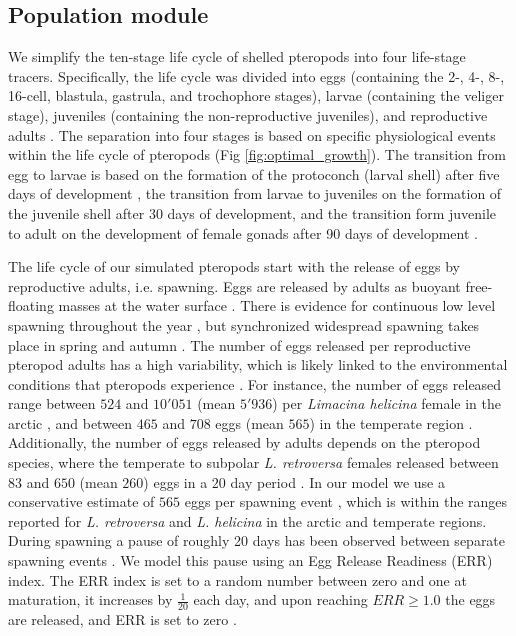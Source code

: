 \subsection{Population module}

We simplify the ten-stage life cycle of shelled pteropods \citep{Howes2014Lab,Thabet2015Lifestages} into four life-stage tracers. Specifically, the life cycle was divided into eggs (containing the 2-, 4-, 8-, 16-cell, blastula, gastrula, and trochophore stages), larvae (containing the veliger stage), juveniles (containing the non-reproductive juveniles), and reproductive adults \citep{Howes2014Lab,Thabet2015Lifestages}. The separation into four stages is based on specific physiological events within the life cycle of pteropods  (Fig \ref{fig:optimal_growth}). The transition from egg to larvae is based on the formation of the protoconch (larval shell) after five days of development \citep{Thabet2015Lifestages}, the transition from larvae to juveniles on the formation of the juvenile shell after 30 days of development, and the transition form juvenile to adult on the development of female gonads after 90 days of development \citep{lalli1989pelagic,Thabet2015Lifestages,Bednarsek2016CumulativeEffects}. 

The life cycle of our simulated pteropods start with the release of eggs by reproductive adults, i.e. spawning. Eggs are released by adults as buoyant free-floating masses at the water surface \citep{Lalli1978Reproduction,Paranjape1968egg,Schalk1990SeasonalSpatial,Gannefors2005Overwintering,Comeau2010Predation,Manno2016EggsAcidification}. There is evidence for continuous low level spawning  throughout the year \citep{Wang2017Lifecycle,Thabet2015Lifestages}, but synchronized widespread spawning takes place in spring and autumn \citep{lalli1989pelagic,Thabet2015Lifestages,Wang2017Lifecycle}. The number of eggs released per reproductive pteropod adults has a high variability, which is likely linked to the environmental conditions that pteropods experience \citep{Manno2016EggsAcidification}. For instance, the number of eggs released range between $524$ and $10'051$ (mean $5'936$) per \textit{Limacina helicina} female in the arctic \citep{Lalli1978Reproduction}, and between $465$ and $708$ eggs (mean $565$) in the temperate region \citep{Paranjape1968egg}. Additionally, the number of eggs released by adults depends on the pteropod species, where the temperate to subpolar \textit{L. retroversa} females released  between $83$ and $650$ (mean $260$) eggs in a $20$ day period \citep{Lalli1978Reproduction}. In our model we use a conservative estimate of $565$ eggs per spawning event \citep{Paranjape1968egg}, which is within the ranges reported for \textit{L. retroversa} and \textit{L. helicina} in the arctic and temperate regions. During spawning a pause of roughly 20 days has been observed between separate spawning events \citep{Paranjape1968egg}. We model this pause using an Egg Release Readiness (ERR) index. The ERR index is set to a random number between zero and one at maturation, it increases by $\frac{1}{20}$ each day, and upon reaching $ERR \geq 1.0$ the eggs are released, and ERR is set to zero \citep[similar to the Clutch Readiness Fraction presented in ][]{Miller1998CalanusIBM}. 

